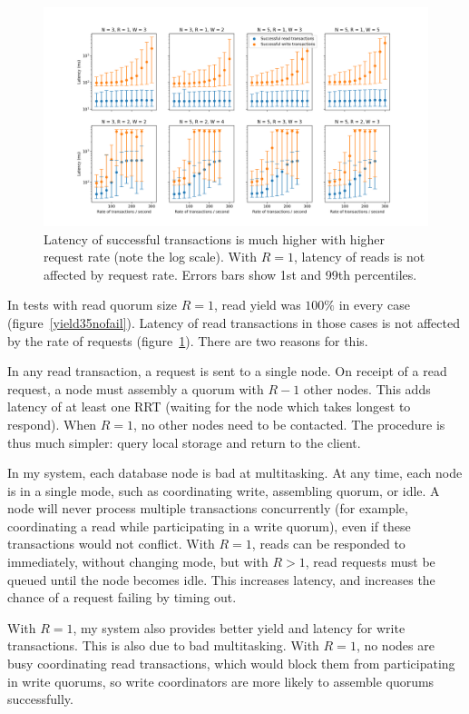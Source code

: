 \documentclass[12pt,a4paper,twoside,openany]{report}
\begin{document}
\begin{figure}[ht]
\centerline{\includegraphics[width=\paperwidth]{figs/eval-fig-5.png}}
\caption{Latency of successful transactions is much higher with higher request rate (note the log scale). With $R = 1$, latency of reads is not affected by request rate. Errors bars show 1st and 99th percentiles.}
\label{latency35nofail}
\end{figure}

In tests with read quorum size $R = 1$, read yield was $100\%$ in every case (figure~\ref{yield35nofail}). Latency of read transactions in those cases is not affected by the rate of requests (figure~\ref{latency35nofail}). There are two reasons for this.

In any read transaction, a request is sent to a single node. On receipt of a read request, a node must assembly a quorum with $R-1$ other nodes. This adds latency of at least one RRT (waiting for the node which takes longest to respond). When $R = 1$, no other nodes need to be contacted. The procedure is thus much simpler: query local storage and return to the client.

In my system, each database node is bad at multitasking. At any time, each node is in a single mode, such as coordinating write, assembling quorum, or idle. A node will never process multiple transactions concurrently (for example, coordinating a read while participating in a write quorum), even if these transactions would not conflict. With $R = 1$, reads can be responded to immediately, without changing mode, but with $R>1$, read requests must be queued until the node becomes idle. This increases latency, and increases the chance of a request failing by timing out.

With $R = 1$, my system also provides better yield and latency for write transactions. This is also due to bad multitasking. With $R = 1$, no nodes are busy coordinating read transactions, which would block them from participating in write quorums, so write coordinators are more likely to assemble quorums successfully.
\end{document}
